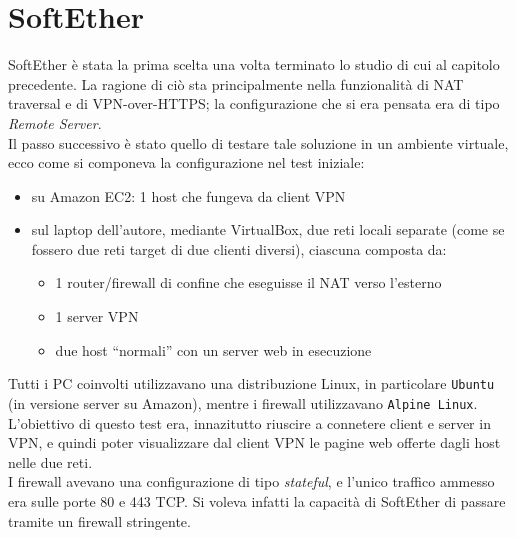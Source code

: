 \section{SoftEther}
SoftEther è stata la prima scelta una volta terminato lo studio di cui al
capitolo precedente. La ragione di ciò
sta principalmente nella funzionalità di NAT traversal e di VPN-over-HTTPS; la
configurazione che si era pensata era di tipo \textit{Remote Server}.\\
Il passo successivo è stato quello di testare tale soluzione in un ambiente virtuale,
ecco come si componeva la configurazione nel test
iniziale:
\begin{itemize}
  \item su Amazon EC2: 1 host che fungeva da client VPN
  \item sul laptop dell'autore, mediante VirtualBox, due reti locali separate (come
  se fossero due reti target di due clienti diversi), ciascuna composta da:
  \begin{itemize}
    \item 1 router/firewall di confine che eseguisse il NAT verso l'esterno
    \item 1 server VPN
    \item due host ``normali'' con un server web in esecuzione
  \end{itemize}
\end{itemize}
Tutti i PC coinvolti utilizzavano una distribuzione Linux, in particolare \texttt{Ubuntu}
(in versione server su Amazon), mentre i firewall utilizzavano \texttt{Alpine Linux}.\\
L'obiettivo di questo test era, innazitutto riuscire a connetere client e server in
VPN, e quindi poter visualizzare dal client VPN le pagine web offerte dagli host
nelle due reti.\\
I firewall avevano una configurazione di tipo \textit{stateful}, e l'unico traffico
ammesso era sulle porte 80 e 443 TCP. Si voleva infatti la capacità di SoftEther di passare
tramite un firewall stringente.


